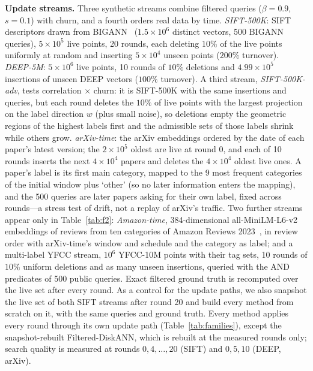 \documentclass[conference]{IEEEtran}
\begin{document}
\textbf{Update streams.} Three synthetic streams combine filtered queries ($\beta{=}0.9$, $s{=}0.1$) with churn, and a fourth orders real data by time. \emph{SIFT-500K}: SIFT descriptors drawn from BIGANN~\cite{bigann1b} ($1.5\times10^6$ distinct vectors, 500 BIGANN queries), $5\times10^5$ live points, 20 rounds, each deleting $10\%$ of the live points uniformly at random and inserting $5\times10^4$ unseen points ($200\%$ turnover). \emph{DEEP-5M}: $5\times10^6$ live points, 10 rounds of $10\%$ deletions and $4.99\times10^5$ insertions of unseen DEEP vectors ($100\%$ turnover). A third stream, \emph{SIFT-500K-adv}, tests correlation $\times$ churn: it is SIFT-500K with the same insertions and queries, but each round deletes the $10\%$ of live points with the largest projection on the label direction $w$ (plus small noise), so deletions empty the geometric regions of the highest labels first and the admissible sets of those labels shrink while others grow. \emph{arXiv-time}: the arXiv embeddings ordered by the date of each paper's latest version; the $2\times10^5$ oldest are live at round 0, and each of 10 rounds inserts the next $4\times10^4$ papers and deletes the $4\times10^4$ oldest live ones. A paper's label is its first main category, mapped to the 9 most frequent categories of the initial window plus `other' (so no later information enters the mapping), and the 500 queries are later papers asking for their own label, fixed across rounds---a stress test of drift, not a replay of arXiv's traffic. Two further streams appear only in Table~\ref{tab:f2}: \emph{Amazon-time}, 384-dimensional all-MiniLM-L6-v2 embeddings of reviews from ten categories of Amazon Reviews 2023~\cite{amazon2023}, in review order with arXiv-time's window and schedule and the category as label; and a multi-label YFCC stream, $10^6$ YFCC-10M points with their tag sets, 10 rounds of $10\%$ uniform deletions and as many unseen insertions, queried with the AND predicates of 500 public queries. Exact filtered ground truth is recomputed over the live set after every round. As a control for the update paths, we also snapshot the live set of both SIFT streams after round 20 and build every method from scratch on it, with the same queries and ground truth. Every method applies every round through its own update path (Table~\ref{tab:families}), except the snapshot-rebuilt Filtered-DiskANN, which is rebuilt at the measured rounds only; search quality is measured at rounds $0,4,\dots,20$ (SIFT) and $0,5,10$ (DEEP, arXiv).
\end{document}
